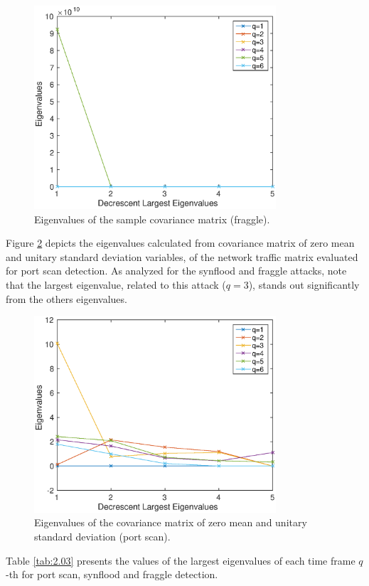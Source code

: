 \begin{figure}[h!]
	\centering
     \includegraphics[width=9cm]{figures/ch2/eigenvalues_fraggle.eps}
     \caption{Eigenvalues of the sample covariance matrix (fraggle).}
     \label{fig:2.11}
\end{figure}

Figure \ref{fig:2.12} depicts the eigenvalues calculated from covariance matrix of zero mean and unitary standard deviation variables, of the network traffic matrix evaluated for port scan detection. As analyzed for the synflood and fraggle attacks, note that the largest eigenvalue, related to this attack ($q = 3$), stands out significantly from the others eigenvalues.

\begin{figure}[h!]
	\centering
     \includegraphics[width=9cm]{figures/ch2/eigenvalues_portscan.eps}
     \caption{Eigenvalues of the covariance matrix of zero mean and unitary standard deviation (port scan).}
     \label{fig:2.12}
\end{figure}

Table \ref{tab:2.03} presents the values of the largest eigenvalues of each time frame $q$-th for port scan, synflood and fraggle detection. 

